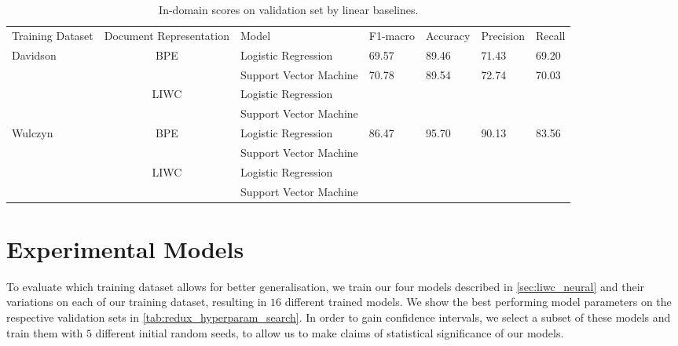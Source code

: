 \begin{table}[]
\centering
\begin{tabular}{lclllll}
Training Dataset          & \multicolumn{1}{l}{Document Representation} & Model                   & F1-macro & Accuracy & Precision & Recall \\
\multirow{4}{*}{Davidson} & \multirow{2}{*}{BPE}                        & Logistic Regression     & 69.57    & 89.46    & 71.43     & 69.20  \\
                          &                                             & Support Vector Machine  & 70.78    & 89.54    & 72.74     & 70.03  \\
                          & \multirow{2}{*}{LIWC}                       & Logistic Regression     &          &          &           &        \\
                          &                                             & Support Vector Machine  &          &          &           &        \\
\multirow{4}{*}{Wulczyn}  & \multirow{2}{*}{BPE}                        & Logistic Regression     & 86.47    & 95.70    & 90.13     & 83.56  \\
                          &                                             & Support Vector Machine  &          &          &           &        \\
                          & \multirow{2}{*}{LIWC}                       & Logistic Regression     &          &          &           &        \\
                          &                                             & Support Vector Machine  &          &          &           &
\end{tabular}%
\caption{In-domain scores on validation set by linear baselines.}
\label{tab:redux_linear_baselines_dev}
\end{table}

\section{Experimental Models}

To evaluate which training dataset allows for better generalisation, we train our four models described in \autoref{sec:liwc_neural} and their variations on each of our training dataset, resulting in $16$ different trained models. We show the best performing model parameters on the respective validation sets in \autoref{tab:redux_hyperparam_search}. In order to gain confidence intervals, we select a subset of these models and train them with $5$ different initial random seeds, to allow us to make claims of statistical significance of our models.

